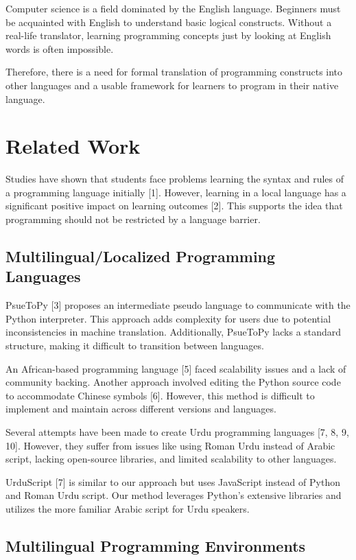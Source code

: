\documentclass[conference]{IEEEtran}
\begin{document}
Computer science is a field dominated by the English language. Beginners must be acquainted with English to understand basic logical constructs. Without a real-life translator, learning programming concepts just by looking at English words is often impossible.

Therefore, there is a need for formal translation of programming constructs into other languages and a usable framework for learners to program in their native language.

\section{Related Work}

Studies have shown that students face problems learning the syntax and rules of a programming language initially [1]. However, learning in a local language has a significant positive impact on learning outcomes [2]. This supports the idea that programming should not be restricted by a language barrier.

\subsection{Multilingual/Localized Programming Languages}

PsueToPy [3] proposes an intermediate pseudo language to communicate with the Python interpreter. This approach adds complexity for users due to potential inconsistencies in machine translation. Additionally, PsueToPy lacks a standard structure, making it difficult to transition between languages. 

An African-based programming language [5] faced scalability issues and a lack of community backing. Another approach involved editing the Python source code to accommodate Chinese symbols [6]. However, this method is difficult to implement and maintain across different versions and languages.

Several attempts have been made to create Urdu programming languages [7, 8, 9, 10]. However, they suffer from issues like using Roman Urdu instead of Arabic script, lacking open-source libraries, and limited scalability to other languages.

UrduScript [7] is similar to our approach but uses JavaScript instead of Python and Roman Urdu script. Our method leverages Python's extensive libraries and utilizes the more familiar Arabic script for Urdu speakers.

\subsection{Multilingual Programming Environments}
\end{document}
